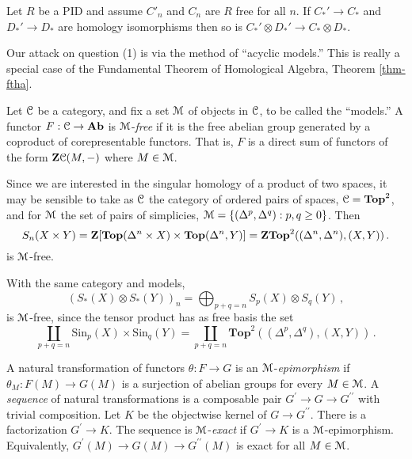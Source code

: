 \begin{corollary}\label{acyclic-tensor}
Let $R$ be a PID and assume $C'_n$ and $C_n$ are $R$ free for all $n$.
If $C_*'\to C_\ast$ and $D_*'\to D_\ast$ 
are homology
isomorphisms then so is $C_*'\otimes D_*'\to C_\ast\otimes D_\ast$. 
\end{corollary}

Our attack on question (1) is via the method of ``acyclic models.'' This is
really a special case of the Fundamental Theorem of Homological Algebra,
Theorem \ref{thm-ftha}.

\begin{definition}
Let $\mathcal C$ be a category, and fix a set $\mathcal M$ of objects in $\mathcal C$, 
to be called the ``models.'' 
A functor $F:\mathcal C\to\mathbf{Ab}$ is $\mathcal M$-{\em free} if it is the free abelian 
group generated by a coproduct of corepresentable functors. That is, $F$ is a 
direct sum of functors of the form $\mathbf Z\mathcal C(M,-)$ where $M\in\mathcal M$.
\end{definition}
\begin{example}
Since we are interested in the singular homology of a product of two spaces, 
it may be sensible to take as $\mathcal C$ the category of ordered pairs of spaces,
$\mathcal C=\mathbf{Top}^2$, and for $\mathcal M$ the set of pairs of
simplicies, $\mathcal M=\{(\Delta^p,\Delta^q):p,q\geq0\}$. Then 
\[
S_n(X\times Y)=\mathbf Z[\mathbf{Top}(\Delta^n\times X)\times
\mathbf{Top}(\Delta^n,Y)]=
\mathbf Z\mathbf{Top}^2((\Delta^n,\Delta^n),(X,Y))\,.
\]
is $\mathcal M$-free.
\end{example}
\begin{example}
With the same category and models, 
\[
(S_*(X)\otimes S_*(Y))_n=\bigoplus_{p+q=n}S_p(X)\otimes S_q(Y)\,,
\]
is $\mathcal M$-free, since the tensor product has as free basis the set
\[
\coprod_{p+q=n}\mathrm{Sin}_p(X)\times\mathrm{Sin}_q(Y)
=\coprod_{p+q=n}\mathbf{Top}^2((\Delta^p,\Delta^q),(X,Y))\,.
\]
\end{example}
\begin{definition}
A natural transformation of functors $\theta:F\to G$ is an $\mathcal M$-{\em epimorphism} if $\theta_M:F(M)\to G(M)$ is a surjection of abelian groups for every $M\in\mathcal M$. A {\em sequence} of natural transformations is a composable pair 
$G^\prime\to G\to G^{\prime\prime}$ with trivial composition. 
Let $K$ be the objectwise kernel of $G\to G^{\prime\prime}$. There is a factorization $G^\prime\to K$. The sequence is $\mathcal M$-{\em exact} if $G^\prime\to K$ is a $\mathcal M$-epimorphism. Equivalently, $G^\prime(M)\to G(M)\to G^{\prime\prime}(M)$ is exact for all $M\in\mathcal M$.
\end{definition}
